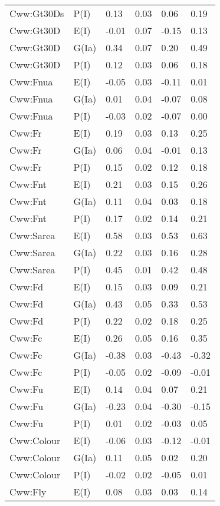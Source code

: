 \begin{center}
\begin{longtable}{|p{1.1in}|p{0.7in}|p{0.7in}|p{0.6in}|p{0.6in}|p{0.6in}|}
  Cww:Gt30Ds & P(I) & 0.13 & 0.03 & 0.06 & 0.19 \\ 
  Cww:Gt30D & E(I) & -0.01 & 0.07 & -0.15 & 0.13 \\ 
  Cww:Gt30D & G(Ia) & 0.34 & 0.07 & 0.20 & 0.49 \\ 
  Cww:Gt30D & P(I) & 0.12 & 0.03 & 0.06 & 0.18 \\ 
  Cww:Fnua & E(I) & -0.05 & 0.03 & -0.11 & 0.01 \\ 
  Cww:Fnua & G(Ia) & 0.01 & 0.04 & -0.07 & 0.08 \\ 
  Cww:Fnua & P(I) & -0.03 & 0.02 & -0.07 & 0.00 \\ 
  Cww:Fr & E(I) & 0.19 & 0.03 & 0.13 & 0.25 \\ 
  Cww:Fr & G(Ia) & 0.06 & 0.04 & -0.01 & 0.13 \\ 
  Cww:Fr & P(I) & 0.15 & 0.02 & 0.12 & 0.18 \\ 
  Cww:Fnt & E(I) & 0.21 & 0.03 & 0.15 & 0.26 \\ 
  Cww:Fnt & G(Ia) & 0.11 & 0.04 & 0.03 & 0.18 \\ 
  Cww:Fnt & P(I) & 0.17 & 0.02 & 0.14 & 0.21 \\ 
  Cww:Sarea & E(I) & 0.58 & 0.03 & 0.53 & 0.63 \\ 
  Cww:Sarea & G(Ia) & 0.22 & 0.03 & 0.16 & 0.28 \\ 
  Cww:Sarea & P(I) & 0.45 & 0.01 & 0.42 & 0.48 \\ 
  Cww:Fd & E(I) & 0.15 & 0.03 & 0.09 & 0.21 \\ 
  Cww:Fd & G(Ia) & 0.43 & 0.05 & 0.33 & 0.53 \\ 
  Cww:Fd & P(I) & 0.22 & 0.02 & 0.18 & 0.25 \\ 
  Cww:Fc & E(I) & 0.26 & 0.05 & 0.16 & 0.35 \\ 
  Cww:Fc & G(Ia) & -0.38 & 0.03 & -0.43 & -0.32 \\ 
  Cww:Fc & P(I) & -0.05 & 0.02 & -0.09 & -0.01 \\ 
  Cww:Fu & E(I) & 0.14 & 0.04 & 0.07 & 0.21 \\ 
  Cww:Fu & G(Ia) & -0.23 & 0.04 & -0.30 & -0.15 \\ 
  Cww:Fu & P(I) & 0.01 & 0.02 & -0.03 & 0.05 \\ 
  Cww:Colour & E(I) & -0.06 & 0.03 & -0.12 & -0.01 \\ 
  Cww:Colour & G(Ia) & 0.11 & 0.05 & 0.02 & 0.20 \\ 
  Cww:Colour & P(I) & -0.02 & 0.02 & -0.05 & 0.01 \\ 
  Cww:Fly & E(I) & 0.08 & 0.03 & 0.03 & 0.14 \\ 

\end{longtable}
\end{center}
